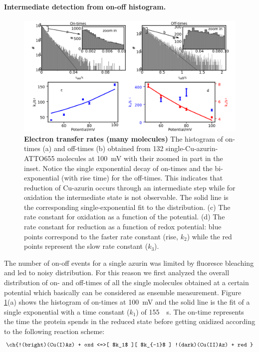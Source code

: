 \paragraph*{Intermediate detection from on-off histogram.}
\begin{figure}
	\centering
	\includegraphics[width=\textwidth]{many_sm_hist}
	\caption{\textbf{Electron transfer rates (many molecules)} The histogram of on-times (a) and off-times (b) obtained from 132 single-Cu-azurin-ATTO655 molecules at \SI{100}{\mV} with their zoomed in part in the inset.
	Notice the single exponential decay of on-times and the bi-exponential (with rise time) for the off-times.
	This indicates that  reduction of Cu-azurin occurs through an intermediate step while for oxidation the intermediate state is not observable.
	The solid line is the corresponding single-exponential fit to the distribution.
	(c) The rate constant for oxidation as a function of the potential. 
	(d) The rate constant for reduction as a function of redox potential: blue points correspond to the faster rate constant (rise, $k_2$) while the red points represent the slow rate constant ($k_3$).}
	\label{fig:many_sm_hist}
\end{figure}
The number of on-off events for a single azurin was limited by fluoresce bleaching and led to noisy distribution.
For this reason we first analyzed the overall distribution of on- and off-times of all the single molecules obtained at a certain potential which basically can be considered as ensemble measurement.
Figure \ref{fig:many_sm_hist}(a) shows the histogram of on-times at \SI{100}{\mV} and the solid line is the fit of a single exponential with a time constant ($k_{1}$) of \SI{155}{\per\s}.
The on-time represents the time the protein spends in the reduced state before getting oxidized according to the following reaction scheme:
\begin{align}
	\ch{!(bright)(Cu(I)Az) + oxd <=>[ $k_1$ ][ $k_{-1}$ ] !(dark)(Cu(II)Az) + red }
	\label{eq:oxidation}
\end{align}
